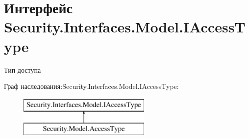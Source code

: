 \hypertarget{interface_security_1_1_interfaces_1_1_model_1_1_i_access_type}{}\section{Интерфейс Security.\+Interfaces.\+Model.\+I\+Access\+Type}
\label{interface_security_1_1_interfaces_1_1_model_1_1_i_access_type}


Тип доступа  


Граф наследования\+:Security.\+Interfaces.\+Model.\+I\+Access\+Type\+:\begin{figure}[H]
\begin{center}
\leavevmode
\includegraphics[height=2.000000cm]{dc/d50/interface_security_1_1_interfaces_1_1_model_1_1_i_access_type}
\end{center}
\end{figure}
